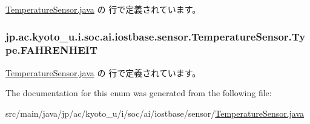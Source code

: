  \hyperlink{_temperature_sensor_8java_source}{Temperature\-Sensor.\-java} の  行で定義されています。

\hypertarget{enumjp_1_1ac_1_1kyoto__u_1_1i_1_1soc_1_1ai_1_1iostbase_1_1sensor_1_1_temperature_sensor_1_1_type_a871402cbd503faa725f464f38d735955}{
\subsubsection[{F\-A\-H\-R\-E\-N\-H\-E\-I\-T}]{\setlength{\rightskip}{0pt plus 5cm}jp.\-ac.\-kyoto\-\_\-u.\-i.\-soc.\-ai.\-iostbase.\-sensor.\-Temperature\-Sensor.\-Type.\-F\-A\-H\-R\-E\-N\-H\-E\-I\-T}}\label{enumjp_1_1ac_1_1kyoto__u_1_1i_1_1soc_1_1ai_1_1iostbase_1_1sensor_1_1_temperature_sensor_1_1_type_a871402cbd503faa725f464f38d735955}


 \hyperlink{_temperature_sensor_8java_source}{Temperature\-Sensor.\-java} の  行で定義されています。



The documentation for this enum was generated from the following file\-:\begin{DoxyCompactItemize}
\item 
src/main/java/jp/ac/kyoto\-\_\-u/i/soc/ai/iostbase/sensor/\hyperlink{_temperature_sensor_8java}{Temperature\-Sensor.\-java}\end{DoxyCompactItemize}
